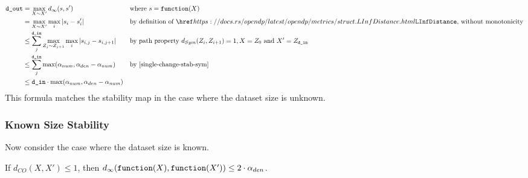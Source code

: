 \documentclass{article}
\begin{document}
\begin{align*}
    \dout &= \max\limits_{X \sim X'} d_{\infty}(s, s') &&\text{where } s = \function(X)\\
    &= \max\limits_{X \sim X'} \max\limits_{i} |s_i - s'_i| &&\text{by definition of }\rustdoc{metrics/struct}{LInfDistance} \text{, without monotonicity} \\
    &\leq \sum_j^{\din} \max\limits_{Z_{j} \sim Z_{j+1}} \max\limits_{i} |s_{i,j} - s_{i,j+1}| &&\text{by path property } d_{Sym}(Z_i, Z_{i+1}) = 1, X = Z_0 \text{ and } X' = Z_\din \\
    &\leq \sum_j^{\din} \max(\alpha_{num}, \alpha_{den} - \alpha_{num}) &&\text{by \ref{single-change-stab-sym}} \\
    &\leq \din \cdot \max(\alpha_{num}, \alpha_{den} - \alpha_{num}) \\
\end{align*}
\label{sec:unknown-size}
This formula matches the stability map in the case where the dataset size is unknown.


\subsubsection{Known Size Stability}
\label{sec:known-size}
Now consider the case where the dataset size is known.

\begin{lemma}
    \label{single-change-stab}
    If $d_{CO}(X, X') \le 1$, then $d_\infty(\texttt{function}(X), \texttt{function}(X')) \le 2 \cdot \alpha_{den}$.
\end{lemma}
\end{document}
